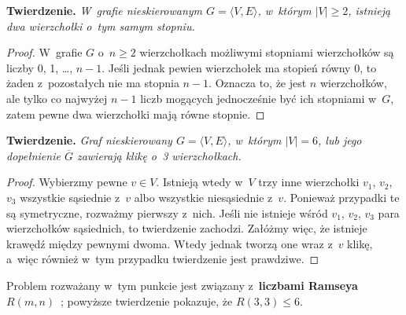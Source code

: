 
\subproblem %
\textsf{\textbf{Twierdzenie.}} \textit{W~grafie nieskierowanym\/ $G=\langle V,E\rangle$, w~którym\/ $|V|\ge2$, istnieją dwa wierzchołki o~tym samym stopniu.}
\begin{proof}
W~grafie $G$ o~$n\ge2$ wierzchołkach możliwymi stopniami wierzchołków są liczby 0, 1, \dots, $n-1$.
Jeśli jednak pewien wierzchołek ma stopień równy 0, to żaden z~pozostałych nie ma stopnia $n-1$.
Oznacza to, że jest $n$ wierzchołków, ale tylko co najwyżej $n-1$ liczb mogących jednocześnie być ich stopniami w~$G$, zatem pewne dwa wierzchołki mają równe stopnie.
\end{proof}

\subproblem %
\textsf{\textbf{Twierdzenie.}} \textit{Graf nieskierowany\/ $G=\langle V,E\rangle$, w~którym\/ $|V|=6$, lub jego dopełnienie\/ $\overline{G}$ zawierają klikę o~3 wierzchołkach.}
\begin{proof}
Wybierzmy pewne $v\in V$.
Istnieją wtedy w~$V$ trzy inne wierzchołki $v_1$, $v_2$, $v_3$ wszystkie sąsiednie z~$v$ albo wszystkie niesąsiednie z~$v$.
Ponieważ przypadki te są symetryczne, rozważmy pierwszy z~nich.
Jeśli nie istnieje wśród $v_1$, $v_2$, $v_3$ para wierzchołków sąsiednich, to twierdzenie zachodzi.
Załóżmy więc, że istnieje krawędź między pewnymi dwoma.
Wtedy jednak tworzą one wraz z~$v$ klikę, a~więc również w~tym przypadku twierdzenie jest prawdziwe.
\end{proof}

Problem rozważany w~tym punkcie jest związany z~\textbf{liczbami Ramseya} $R(m,n)$~\cite{ramseynumber}; powyższe twierdzenie pokazuje, że $R(3,3)\le6$.

